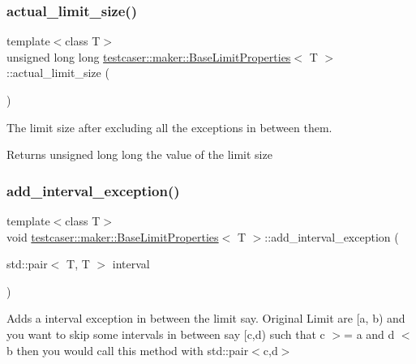 \subsubsection{\texorpdfstring{actual\_limit\_size()}{actual\_limit\_size()}}
{\footnotesize\ttfamily template$<$class T$>$ \\
unsigned long long \mbox{\hyperlink{classtestcaser_1_1maker_1_1BaseLimitProperties}{testcaser\+::maker\+::\+Base\+Limit\+Properties}}$<$ T $>$\+::actual\+\_\+limit\+\_\+size (\begin{DoxyParamCaption}{ }\end{DoxyParamCaption})\hspace{0.3cm}{\ttfamily [inline]}}



The limit size after excluding all the exceptions in between them. 

\begin{DoxyReturn}{Returns}
unsigned long long the value of the limit size 
\end{DoxyReturn}
\mbox{\label{classtestcaser_1_1maker_1_1BaseLimitProperties_ae861156476caee223b806ea3d160040a}} 
\subsubsection{\texorpdfstring{add\_interval\_exception()}{add\_interval\_exception()}}
{\footnotesize\ttfamily template$<$class T$>$ \\
void \mbox{\hyperlink{classtestcaser_1_1maker_1_1BaseLimitProperties}{testcaser\+::maker\+::\+Base\+Limit\+Properties}}$<$ T $>$\+::add\+\_\+interval\+\_\+exception (\begin{DoxyParamCaption}\item[{std\+::pair$<$ T, T $>$}]{interval }\end{DoxyParamCaption})\hspace{0.3cm}{\ttfamily [inline]}}



Adds a interval exception in between the limit say. Original Limit are \mbox{[}a, b) and you want to skip some intervals in between say \mbox{[}c,d) such that c $>$= a and d $<$ b then you would call this method with std\+::pair$<$c,d$>$ 


